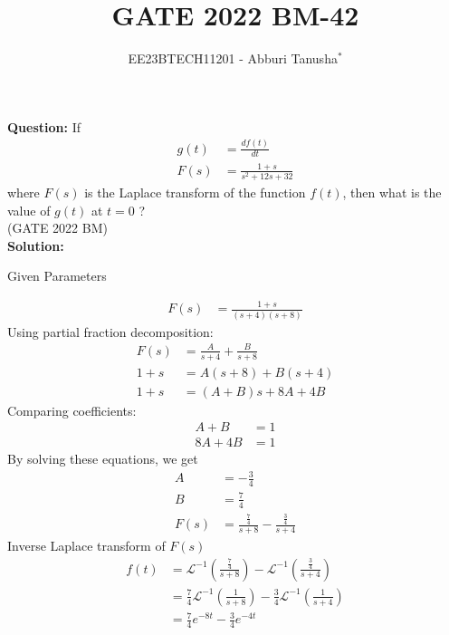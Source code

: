 \documentclass[journal,12pt,twocolumn]{IEEEtran}
\newcommand{\brak}[1]{\left( #1 \right)}
\theoremstyle{remark}
\begin{document}

\vspace{3cm}

\title{GATE 2022 BM-42}
\author{EE23BTECH11201 - Abburi Tanusha$^{*}$%
}
\maketitle
\newpage
\bigskip

\renewcommand{\thefigure}{\theenumi}
\renewcommand{\thetable}{\theenumi}

\vspace{3cm}

\maketitle
\textbf{Question:} 
If 
\begin{align}
 g(t) &= \frac{df(t)}{dt} \\
 F(s) &= \frac{1+s}{s^2+12s+32} 
\end{align} 
where $F(s)$ is the Laplace transform of the function $f(t)$, then what is the value of $g(t)$ at $t=0$ ?\\
\hfill(GATE 2022 BM)\\
\textbf{Solution:} 
\begin{table}[h!]
\centering
\resizebox{6cm}{!}{

}
\caption{Given Parameters}
\label{tab:tanu_tabel}
\end{table}
\begin{align}
F(s) &= \frac{1+s}{(s+4)(s+8)}
\end{align}
Using partial fraction decomposition:
\begin{align}
F(s) &= \frac{A}{s+4} + \frac{B}{s+8} \\
1+s &= A\brak{s+8} + B\brak{s+4} \\
1+s &= \brak{A+B}s + 8A + 4B
\end{align}
Comparing coefficients:
\begin{align}
A+B &= 1 \\
8A + 4B &= 1
\end{align}
By solving these equations, we get
\begin{align}
A &= -\frac{3}{4} \\
B &= \frac{7}{4}  \\
F(s) &= \frac{\frac{7}{4}}{s+8} - \frac{\frac{3}{4}}{s+4} 
\end{align}
Inverse Laplace transform of $F(s)$ 
\begin{align}
f(t) &= \mathcal{L}^{-1}\brak{\frac{\frac{7}{4}}{s+8}} - \mathcal{L}^{-1}\brak{\frac{\frac{3}{4}}{s+4}} \\
&= \frac{7}{4}\mathcal{L}^{-1}\brak{\frac{1}{s+8}} - \frac{3}{4}\mathcal{L}^{-1}\brak{\frac{1}{s+4}} \\
&= \frac{7}{4}e^{-8t} - \frac{3}{4}e^{-4t}
\end{align}
\end{document}
